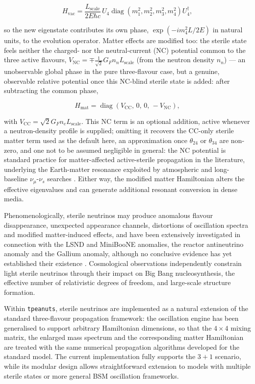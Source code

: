 \begin{equation}
  H_{\mathrm{vac}} = \frac{L_{\mathrm{scale}}}{2E\hbar c}\,U_4\operatorname{diag}\!\left(m_1^2,m_2^2,m_3^2,m_4^2\right)U_4^{\dagger},
\end{equation}

so the new eigenstate contributes its own phase, \(\exp(-im_4^2L/2E)\) in natural units, to the evolution operator. Matter effects are modified too: the sterile state feels neither the charged- nor the neutral-current (NC) potential common to the three active flavours, \(V_{\mathrm{NC}}=\mp\frac{1}{\sqrt2}G_Fn_nL_{\mathrm{scale}}\) (from the neutron density \(n_n\)) — an unobservable global phase in the pure three-flavour case, but a genuine, observable relative potential once this NC-blind sterile state is added: after subtracting the common phase,

\begin{equation}
  H_{\mathrm{mat}} = \operatorname{diag}(V_{\mathrm{CC}},\,0,\,0,\,-V_{\mathrm{NC}}),
\end{equation}

with \(V_{\mathrm{CC}}=\sqrt2 G_F n_e L_{\mathrm{scale}}\). This NC term is an optional addition, active whenever a neutron-density profile is supplied; omitting it recovers the CC-only sterile matter term used as the default here, an approximation once \(\theta_{24}\) or \(\theta_{34}\) are non-zero, and one not to be assumed negligible in general: the NC potential is standard practice for matter-affected active-sterile propagation in the literature, underlying the Earth-matter resonance exploited by atmospheric and long-baseline \(\nu_\mu\)-\(\nu_s\) searches \parencite{Abbasi2020IceCubeSterile}. Either way, the modified matter Hamiltonian alters the effective eigenvalues and can generate additional resonant conversion in dense media.

Phenomenologically, sterile neutrinos may produce anomalous flavour disappearance, unexpected appearance channels, distortions of oscillation spectra and modified matter-induced effects, and have been extensively investigated in connection with the LSND and MiniBooNE anomalies, the reactor antineutrino anomaly and the Gallium anomaly, although no conclusive evidence has yet established their existence \parencite{Boser2020}. Cosmological observations independently constrain light sterile neutrinos through their impact on Big Bang nucleosynthesis, the effective number of relativistic degrees of freedom, and large-scale structure formation.

Within \texttt{tpeanuts}, sterile neutrinos are implemented as a natural extension of the standard three-flavour propagation framework: the oscillation engine has been generalised to support arbitrary Hamiltonian dimensions, so that the \(4\times4\) mixing matrix, the enlarged mass spectrum and the corresponding matter Hamiltonian are treated with the same numerical propagation algorithms developed for the standard model. The current implementation fully supports the \(3+1\) scenario, while its modular design allows straightforward extension to models with multiple sterile states or more general BSM oscillation frameworks.

